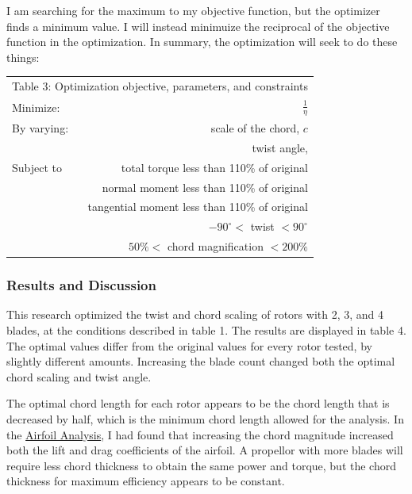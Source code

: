 \documentclass{article}
\begin{document}
\raggedright
I am searching for the maximum to my objective function, but the optimizer finds a minimum value. I will instead minimuize the reciprocal of the objective function in the optimization. In summary, the optimization will seek to do these things: \newline

\begin{tabular}{l  r}
	 \multicolumn{2}{c}{Table 3: Optimization objective, parameters, and constraints}  \\
  	Minimize: & $\frac{1}{\eta}$ \\ \hline
  	By varying: & scale of the chord, $c$ \\ 
  	 & twist angle, \\  \hline
  	Subject to & total torque less than 110\% of original \\ 
	 & normal moment less than 110\% of original \\ 
	 & tangential moment less than 110\% of original \\ 
	 & $-90^{\circ} <$ twist $< 90^{\circ}$ \\
	 & $50\% <$ chord magnification $< 200\% $
\end{tabular} \newline

\subsubsection*{Results and Discussion}

This research optimized the twist and chord scaling of rotors with 2, 3, and 4 blades, at the conditions described in table 1. The results are displayed in table 4. The optimal values differ from the original values for every rotor tested, by slightly different amounts. Increasing the blade count changed both the optimal chord scaling and twist angle. \newline

The optimal chord length for each rotor appears to be the chord length that is decreased by half, which is the minimum chord length allowed for the analysis. In the \href{https://github.com/JoeSpencer1/497R-Projects/blob/main/Airfoil Analysis/Airfoil_Analysis.pdf}{Airfoil Analysis}, I had found that increasing the chord magnitude increased both the lift and drag coefficients of the airfoil. A propellor with more blades will require less chord thickness to obtain the same power and torque, but the chord thickness for maximum efficiency appears to be constant. \newline
\end{document}
